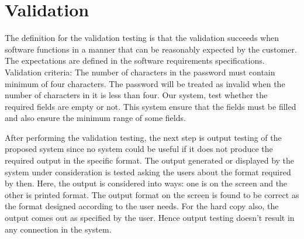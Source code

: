 \section{Validation}

The definition for the validation testing is that the validation succeeds when software functions in a manner that can be reasonably expected by the customer. The expectations are defined in the software requirements specifications. Validation criteria: The number of characters in the password must contain minimum of four characters. The password will be treated as invalid when the number of characters in it is less than four. Our system, test whether the required fields are empty or not. This system ensure that the fields must be filled and also ensure the minimum range of some fields.

After performing the validation testing, the next step is output testing of the proposed system since no system could be useful if it does not produce the required output in the specific format. The output generated or displayed by the system under consideration is tested asking the users about the format required by then. Here, the output is considered into ways: one is on the screen and the other is printed format. The output format on the screen is found to be correct as the format designed according to the user needs. For the hard copy also, the output comes out as specified by the user. Hence output testing doesn’t result in any connection in the system.





%
%
%
